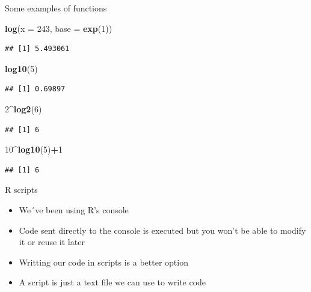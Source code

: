 \documentclass[ignorenonframetext,]{beamer}
\newenvironment{Shaded}{\begin{snugshade}}{\end{snugshade}}
\newcommand{\DataTypeTok}[1]{\textcolor[rgb]{0.13,0.29,0.53}{#1}}
\newcommand{\DecValTok}[1]{\textcolor[rgb]{0.00,0.00,0.81}{#1}}
\newcommand{\KeywordTok}[1]{\textcolor[rgb]{0.13,0.29,0.53}{\textbf{#1}}}
\newcommand{\NormalTok}[1]{#1}
\newcommand{\OperatorTok}[1]{\textcolor[rgb]{0.81,0.36,0.00}{\textbf{#1}}}
\begin{document}
\begin{frame}[fragile]{Some examples of functions}
\protect\hypertarget{some-examples-of-functions-3}{}

\begin{Shaded}
\begin{Highlighting}[]
\KeywordTok{log}\NormalTok{(}\DataTypeTok{x =} \DecValTok{243}\NormalTok{, }\DataTypeTok{base =} \KeywordTok{exp}\NormalTok{(}\DecValTok{1}\NormalTok{))}
\end{Highlighting}
\end{Shaded}

\begin{verbatim}
## [1] 5.493061
\end{verbatim}

\begin{Shaded}
\begin{Highlighting}[]
\KeywordTok{log10}\NormalTok{(}\DecValTok{5}\NormalTok{)}
\end{Highlighting}
\end{Shaded}

\begin{verbatim}
## [1] 0.69897
\end{verbatim}

\begin{Shaded}
\begin{Highlighting}[]
\DecValTok{2}\OperatorTok{^}\KeywordTok{log2}\NormalTok{(}\DecValTok{6}\NormalTok{)}
\end{Highlighting}
\end{Shaded}

\begin{verbatim}
## [1] 6
\end{verbatim}

\begin{Shaded}
\begin{Highlighting}[]
\DecValTok{10}\OperatorTok{^}\KeywordTok{log10}\NormalTok{(}\DecValTok{5}\NormalTok{)}\OperatorTok{+}\DecValTok{1}
\end{Highlighting}
\end{Shaded}

\begin{verbatim}
## [1] 6
\end{verbatim}

\end{frame}

\begin{frame}{R scripts}
\protect\hypertarget{r-scripts}{}

\begin{itemize}
\item
  We´ve been using R's console
\item
  Code sent directly to the console is executed but you won't be able to
  modify it or reuse it later
\item
  Writting our code in scripts is a better option
\item
  A script is just a text file we can use to write code
\end{itemize}

\end{frame}
\end{document}
